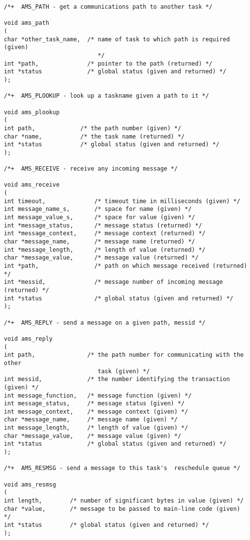 \begin{verbatim}
/*+  AMS_PATH - get a communications path to another task */

void ams_path
(
char *other_task_name,  /* name of task to which path is required (given)
                           */
int *path,              /* pointer to the path (returned) */
int *status             /* global status (given and returned) */
);

/*+  AMS_PLOOKUP - look up a taskname given a path to it */

void ams_plookup 
( 
int path,             /* the path number (given) */
char *name,           /* the task name (returned) */
int *status           /* global status (given and returned) */
);

/*+  AMS_RECEIVE - receive any incoming message */

void ams_receive 
( 
int timeout,              /* timeout time in milliseconds (given) */
int message_name_s,       /* space for name (given) */
int message_value_s,      /* space for value (given) */
int *message_status,      /* message status (returned) */
int *message_context,     /* message context (returned) */
char *message_name,       /* message name (returned) */
int *message_length,      /* length of value (returned) */
char *message_value,      /* message value (returned) */
int *path,                /* path on which message received (returned) */
int *messid,              /* message number of incoming message (returned) */
int *status               /* global status (given and returned) */
);

/*+  AMS_REPLY - send a message on a given path, messid */

void ams_reply
(
int path,               /* the path number for communicating with the other 
                           task (given) */
int messid,             /* the number identifying the transaction (given) */
int message_function,   /* message function (given) */
int message_status,     /* message status (given) */
int message_context,    /* message context (given) */
char *message_name,     /* message name (given) */
int message_length,     /* length of value (given) */
char *message_value,    /* message value (given) */
int *status             /* global status (given and returned) */
);

/*+  AMS_RESMSG - send a message to this task's  reschedule queue */

void ams_resmsg
(
int length,        /* number of significant bytes in value (given) */
char *value,       /* message to be passed to main-line code (given) */
int *status        /* global status (given and returned) */
);


\end{verbatim}
